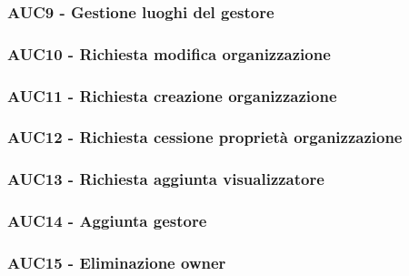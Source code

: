 \documentclass[../analisi-dei-requisiti.tex]{subfiles}
\begin{document}



\subsubsection{AUC9 - Gestione luoghi del gestore}%
\label{subsub:AUC9}



\subsubsection{AUC10 - Richiesta modifica organizzazione}%
\label{subsub:AUC10}



\subsubsection{AUC11 - Richiesta creazione organizzazione}%
\label{subsub:AUC11}



\subsubsection{AUC12 - Richiesta cessione proprietà organizzazione}%
\label{subsub:AUC12}



\subsubsection{AUC13 - Richiesta aggiunta visualizzatore}%
\label{subsub:AUC13}



\subsubsection{AUC14 - Aggiunta gestore}%
\label{subsub:AUC14}



\subsubsection{AUC15 - Eliminazione owner}%
\label{subsub:AUC15}
\end{document}
